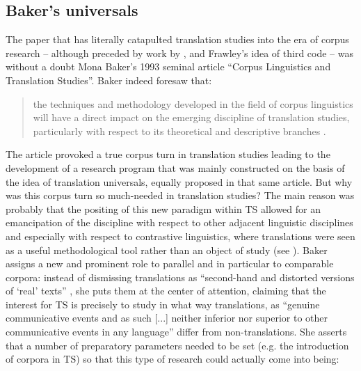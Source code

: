 \subsection{Baker’s universals}
\label{sec:2.2.2}  
\hypertarget{Bakersuniversals}{}
The paper that has literally catapulted translation studies into the era of corpus research – although preceded by work by \citet{toury_search_1980}, \citet{wollin_translationese_1986} and Frawley’s idea of third code \citep{frawley_translation:_1984} – was without a doubt Mona Baker’s 1993 seminal article “Corpus Linguistics and Translation Studies”. Baker indeed foresaw that:

\begin{quote}
the techniques and methodology developed in the field of corpus linguistics will have a direct impact on the emerging discipline of translation studies, particularly with respect to its theoretical and descriptive branches \citep[233]{baker_corpus_1993}.
\end{quote}

The article provoked a true corpus turn in translation studies leading to the development of a research program that was mainly constructed on the basis of the idea of translation universals, equally proposed in that same article. But why was this corpus turn so much-needed in translation studies? The main reason was probably that the positing of this new paradigm within TS allowed for an emancipation of the discipline with respect to other adjacent linguistic disciplines and especially with respect to contrastive linguistics, where translations were seen as a useful methodological tool rather than an object of study (see ). Baker assigns a new and prominent role to parallel and in particular to comparable corpora: instead of dismissing translations as “second-hand and distorted versions of ‘real’ texts” \citep[233]{baker_corpus_1993}, she puts them at the center of attention, claiming that the interest for TS is precisely to study in what way translations, as “genuine communicative events and as such [...] neither inferior nor superior to other communicative events in any language” \citep[234]{baker_corpus_1993} differ from non-translations. She asserts that a number of preparatory parameters needed to be set (e.g. the introduction of corpora in TS) so that this type of research could actually come into being:

